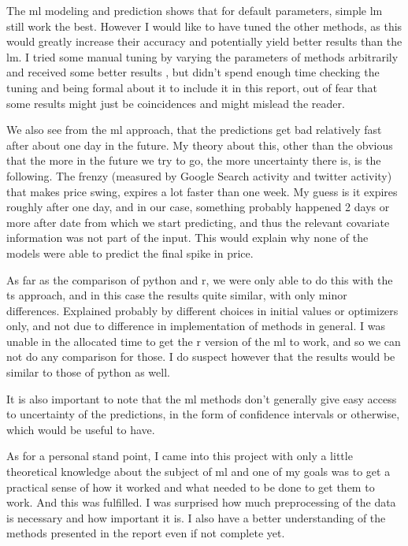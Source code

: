 \documentclass[10pt]{report}
\begin{document}
The \acrlong{ml} modeling and prediction shows that for default parameters, simple \acrlong{lm} still work the best. However I would like to have tuned the other methods, as this would greatly increase their accuracy and potentially yield better results than the \acrlong{lm}. I tried some manual tuning by varying the parameters of methods arbitrarily  and received some better results , but didn't spend enough time checking the tuning and being formal about it to include it in this report, out of fear that some results might just be coincidences and might mislead the reader.

We also see from the \acrlong{ml} approach, that the predictions get bad relatively fast after about one day in the future. 
My theory about this, other than the obvious that the more in the future we try to go, the more uncertainty there is, is the following. The frenzy (measured by Google Search activity and twitter activity) that makes price swing, expires a lot faster than one week. My guess is it expires roughly after one day, and in our case, something probably happened 2 days or more after date from which we start predicting, and thus the relevant covariate information was not part of the input. This would explain why none of the models were able to predict the final spike in price.

As far as the comparison of \Gls{python} and \Gls{r}, we were only able to do this with the \acrlong{ts} approach, and in this case the results quite similar, with only minor differences. Explained probably by different choices in initial values or optimizers only, and not due to difference in implementation of methods in general. I was unable in the allocated time to get the \Gls{r} version of the \acrlong{ml} to work, and so we can not do any comparison for those. I do suspect however that the results would be similar to those of \Gls{python} as well.

It is also important to note that the \acrlong{ml} methods don't generally give easy access to uncertainty of the predictions, in the form of confidence intervals or otherwise, which would be useful to have.

As for a personal stand point, I came into this project with only a  little theoretical knowledge about the subject of \acrlong{ml} and one of my goals was to get a practical sense of how it worked and what needed to be done to get them to work. And this was fulfilled. I was surprised how much preprocessing of the data is necessary and how important it is. I also have a better understanding of the methods presented in the report even if not complete yet.
\end{document}
